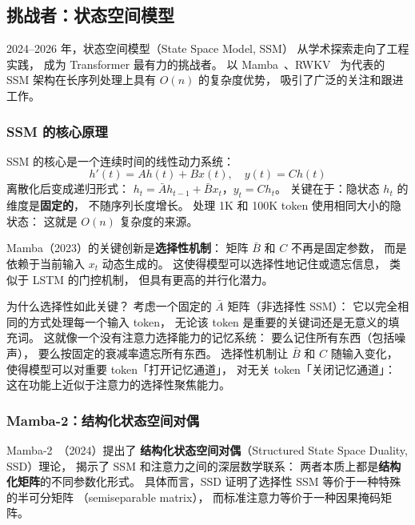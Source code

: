 \subsection{挑战者：状态空间模型}
\label{sec:ssm-challengers}

2024--2026 年，状态空间模型（State Space Model, SSM）
从学术探索走向了工程实践，
成为 Transformer 最有力的挑战者。
以 Mamba~\cite{gu2024mamba}、RWKV~\cite{peng2025rwkv7} 为代表的
SSM 架构在长序列处理上具有 $O(n)$ 的复杂度优势，
吸引了广泛的关注和跟进工作。

\subsubsection{SSM 的核心原理}

SSM 的核心是一个连续时间的线性动力系统：
\begin{equation}
  h'(t) = A h(t) + B x(t), \quad y(t) = C h(t)
\end{equation}
离散化后变成递归形式：
$h_t = \bar{A} h_{t-1} + \bar{B} x_t$，$y_t = C h_t$。
关键在于：隐状态 $h_t$ 的维度是\textbf{固定的}，
不随序列长度增长。
处理 1K 和 100K token 使用相同大小的隐状态：
这就是 $O(n)$ 复杂度的来源。

Mamba（2023）的关键创新是\textbf{选择性机制}：
矩阵 $\bar{B}$ 和 $C$ 不再是固定参数，
而是依赖于当前输入 $x_t$ 动态生成的。
这使得模型可以选择性地记住或遗忘信息，
类似于 LSTM 的门控机制，
但具有更高的并行化潜力。

为什么选择性如此关键？
考虑一个固定的 $\bar{A}$ 矩阵（非选择性 SSM）：
它以完全相同的方式处理每一个输入 token，
无论该 token 是重要的关键词还是无意义的填充词。
这就像一个没有注意力选择能力的记忆系统：
要么记住所有东西（包括噪声），
要么按固定的衰减率遗忘所有东西。
选择性机制让 $\bar{B}$ 和 $C$ 随输入变化，
使得模型可以对重要 token「打开记忆通道」，
对无关 token「关闭记忆通道」：
这在功能上近似于注意力的选择性聚焦能力。

\subsubsection{Mamba-2：结构化状态空间对偶}

Mamba-2~\cite{dao2024mamba2}（2024）提出了
\textbf{结构化状态空间对偶}（Structured State Space Duality, SSD）理论，
揭示了 SSM 和注意力之间的深层数学联系：
两者本质上都是\textbf{结构化矩阵}的不同参数化形式。
具体而言，SSD 证明了选择性 SSM 等价于一种特殊的半可分矩阵
（semiseparable matrix），
而标准注意力等价于一种因果掩码矩阵。

